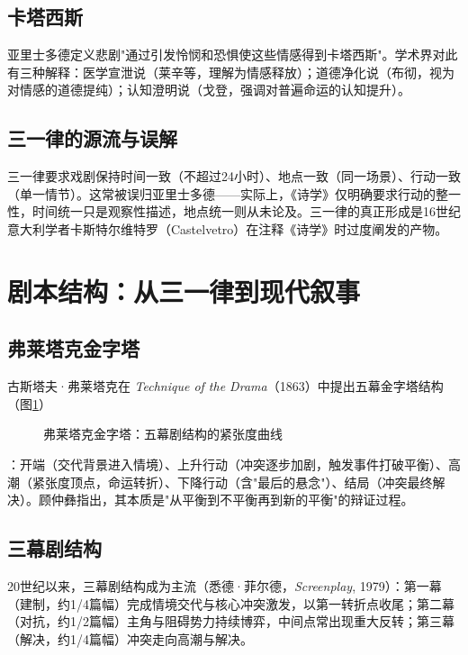 \subsection{卡塔西斯}

亚里士多德定义悲剧"通过引发怜悯和恐惧使这些情感得到卡塔西斯"\cite[第6章]{aristotle:poetics}。学术界对此有三种解释：医学宣泄说（莱辛等，理解为情感释放）；道德净化说（布彻，视为对情感的道德提纯）；认知澄明说（戈登，强调对普遍命运的认知提升）。

\subsection{三一律的源流与误解}

三一律要求戏剧保持时间一致（不超过24小时）、地点一致（同一场景）、行动一致（单一情节）。这常被误归亚里士多德——实际上，《诗学》仅明确要求行动的整一性\cite[第8章]{aristotle:poetics}，时间统一只是观察性描述\cite[第5章]{aristotle:poetics}，地点统一则从未论及。三一律的真正形成是16世纪意大利学者卡斯特尔维特罗（Castelvetro）在注释《诗学》时过度阐发的产物。

\section{剧本结构：从三一律到现代叙事}

\subsection{弗莱塔克金字塔}

古斯塔夫·弗莱塔克在 \textit{Technique of the Drama}（1863）中提出五幕金字塔结构（图\ref{fig:freytag}）

\begin{figure}[htbp]
\centering

\caption{弗莱塔克金字塔：五幕剧结构的紧张度曲线}
\label{fig:freytag}
\end{figure}：开端（交代背景进入情境）、上升行动（冲突逐步加剧，触发事件打破平衡）、高潮（紧张度顶点，命运转折）、下降行动（含"最后的悬念"）、结局（冲突最终解决）。顾仲彝指出，其本质是"从平衡到不平衡再到新的平衡"的辩证过程\cite{gu:playwriting}。

\subsection{三幕剧结构}

20世纪以来，三幕剧结构成为主流（悉德·菲尔德，\textit{Screenplay}, 1979）：第一幕（建制，约1/4篇幅）完成情境交代与核心冲突激发，以第一转折点收尾；第二幕（对抗，约1/2篇幅）主角与阻碍势力持续博弈，中间点常出现重大反转；第三幕（解决，约1/4篇幅）冲突走向高潮与解决。

